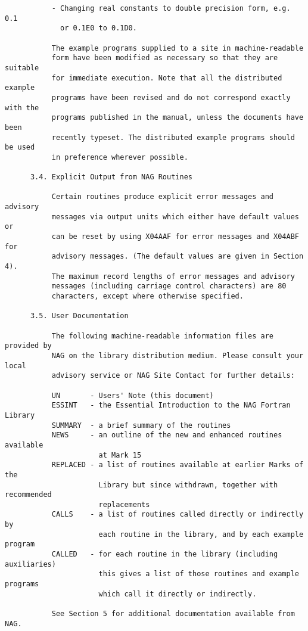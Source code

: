 \begin{small}
\begin{verbatim}
           - Changing real constants to double precision form, e.g. 0.1
             or 0.1E0 to 0.1D0.

           The example programs supplied to a site in machine-readable
           form have been modified as necessary so that they are suitable
           for immediate execution. Note that all the distributed example
           programs have been revised and do not correspond exactly with the
           programs published in the manual, unless the documents have been
           recently typeset. The distributed example programs should be used
           in preference wherever possible.

      3.4. Explicit Output from NAG Routines

           Certain routines produce explicit error messages and advisory
           messages via output units which either have default values or
           can be reset by using X04AAF for error messages and X04ABF for
           advisory messages. (The default values are given in Section 4).
           The maximum record lengths of error messages and advisory
           messages (including carriage control characters) are 80
           characters, except where otherwise specified.

      3.5. User Documentation

           The following machine-readable information files are provided by
           NAG on the library distribution medium. Please consult your local
           advisory service or NAG Site Contact for further details:

           UN       - Users' Note (this document)
           ESSINT   - the Essential Introduction to the NAG Fortran Library
           SUMMARY  - a brief summary of the routines
           NEWS     - an outline of the new and enhanced routines available
                      at Mark 15
           REPLACED - a list of routines available at earlier Marks of the
                      Library but since withdrawn, together with recommended
                      replacements
           CALLS    - a list of routines called directly or indirectly by
                      each routine in the library, and by each example program
           CALLED   - for each routine in the library (including auxiliaries)
                      this gives a list of those routines and example programs
                      which call it directly or indirectly.

           See Section 5 for additional documentation available from NAG.


\end{verbatim}
\end{small}
